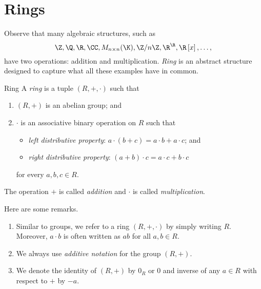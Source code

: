 \documentclass[pmath347]{subfiles}
\begin{document}

    \section{Rings}

    \np[Motivation]Observe that many algebraic structures, such as
    \begin{equation*}
        \Z, \Q, \R, \CC, M_{n\times n}(\K) , \Z /n\Z, \R^{\R}, \R\left[ x \right] , \ldots,
    \end{equation*}
    have two operations: addition and multiplication. \textit{Ring} is an abstract structure designed to capture what all these examples have in common.

    \begin{definition}{Ring}{}
        A \emph{ring} is a tuple $\left( R,+,\cdot \right)$ such that
        \begin{enumerate}
            \item $\left( R,+ \right)$ is an abelian group; and
            \item $\cdot$ is an associative binary operation on $R$ such that
                \begin{itemize}
                    \item \textit{left distributive property}: $a\cdot\left( b+c \right) = a\cdot b + a\cdot c$; and
                    \item \textit{right distributive property}: $\left( a+b \right) \cdot c = a\cdot c+b\cdot c$
                \end{itemize} 
                for every $a,b,c\in R$.
        \end{enumerate}
        The operation $+$ is called \emph{addition} and $\cdot$ is called \emph{multiplication}.
    \end{definition}

    \noindent Here are some remarks.
    \begin{enumerate}
        \item Similar to groups, we refer to a ring $\left( R,+,\cdot \right)$ by simply writing $R$. Moreover, $a\cdot b$ is often written as $ab$ for all $a,b\in R$.
        \item We always use \textit{additive notation} for the group $\left( R,+ \right)$.
        \item We denote the identity of $\left( R,+ \right)$ by $0_R$ or $0$ and inverse of any $a\in R$ with respect to $+$ by $-a$.
    \end{enumerate}
    
\end{document}
